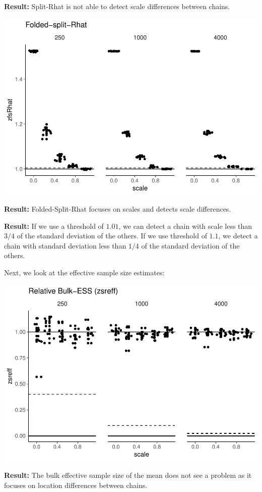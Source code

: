 \documentclass[american,]{article}
\begin{document}
\textbf{Result:} Split-Rhat is not able to detect scale differences
between chains.

\includegraphics{graphics/zfsrhat-scaled-chain-1.pdf}

\textbf{Result:} Folded-Split-Rhat focuses on scales and detects scale
differences.

\textbf{Result:} If we use a threshold of \(1.01\), we can detect a
chain with scale less than \(3/4\) of the standard deviation of the
others. If we use threshold of \(1.1\), we detect a chain with standard
deviation less than \(1/4\) of the standard deviation of the others.

Next, we look at the effective sample size estimates:

\includegraphics{graphics/zsreff-scaled-chain-1.pdf}

\textbf{Result:} The bulk effective sample size of the mean does not see
a problem as it focuses on location differences between chains.
\end{document}
